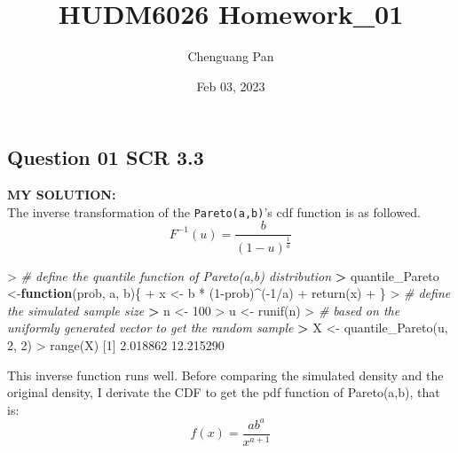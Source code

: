 \documentclass[
]{article}
\title{HUDM6026 Homework\_01}
\author{Chenguang Pan}
\date{Feb 03, 2023}
\newenvironment{Shaded}{\begin{snugshade}}{\end{snugshade}}
\newcommand{\CommentTok}[1]{\textcolor[rgb]{0.56,0.35,0.01}{\textit{#1}}}
\newcommand{\ControlFlowTok}[1]{\textcolor[rgb]{0.13,0.29,0.53}{\textbf{#1}}}
\newcommand{\DecValTok}[1]{\textcolor[rgb]{0.00,0.00,0.81}{#1}}
\newcommand{\ErrorTok}[1]{\textcolor[rgb]{0.64,0.00,0.00}{\textbf{#1}}}
\newcommand{\FloatTok}[1]{\textcolor[rgb]{0.00,0.00,0.81}{#1}}
\newcommand{\FunctionTok}[1]{\textcolor[rgb]{0.00,0.00,0.00}{#1}}
\newcommand{\NormalTok}[1]{#1}
\newcommand{\OtherTok}[1]{\textcolor[rgb]{0.56,0.35,0.01}{#1}}
\newcommand{\SpecialCharTok}[1]{\textcolor[rgb]{0.00,0.00,0.00}{#1}}
\begin{document}
\maketitle

\hypertarget{question-01-scr-3.3}{%
\subsection{Question 01 SCR 3.3}\label{question-01-scr-3.3}}

\textbf{MY SOLUTION:}\\
The inverse transformation of the \texttt{Pareto(a,b)}'s cdf function is
as followed. \[F^{-1}(u)=\frac{b}{(1-u)^\frac{1}{a}} \]

\begin{Shaded}
\begin{Highlighting}[]
\SpecialCharTok{\textgreater{}} \CommentTok{\# define the quantile function of Pareto(a,b) distribution}
\ErrorTok{\textgreater{}}\NormalTok{ quantile\_Pareto }\OtherTok{\textless{}{-}}\ControlFlowTok{function}\NormalTok{(prob, a, b)\{}
\SpecialCharTok{+}\NormalTok{   x }\OtherTok{\textless{}{-}}\NormalTok{ b }\SpecialCharTok{*}\NormalTok{ (}\DecValTok{1}\SpecialCharTok{{-}}\NormalTok{prob)}\SpecialCharTok{\^{}}\NormalTok{(}\SpecialCharTok{{-}}\DecValTok{1}\SpecialCharTok{/}\NormalTok{a)}
\SpecialCharTok{+}   \FunctionTok{return}\NormalTok{(x)}
\SpecialCharTok{+}\NormalTok{ \}}
\SpecialCharTok{\textgreater{}} \CommentTok{\# define the simulated sample size}
\ErrorTok{\textgreater{}}\NormalTok{ n }\OtherTok{\textless{}{-}} \DecValTok{100}
\SpecialCharTok{\textgreater{}}\NormalTok{ u }\OtherTok{\textless{}{-}} \FunctionTok{runif}\NormalTok{(n)}
\SpecialCharTok{\textgreater{}} \CommentTok{\# based on the uniformly generated vector to get the random sample}
\ErrorTok{\textgreater{}}\NormalTok{ X }\OtherTok{\textless{}{-}} \FunctionTok{quantile\_Pareto}\NormalTok{(u, }\DecValTok{2}\NormalTok{, }\DecValTok{2}\NormalTok{)}
\SpecialCharTok{\textgreater{}} \FunctionTok{range}\NormalTok{(X)}
\NormalTok{[}\DecValTok{1}\NormalTok{]  }\FloatTok{2.018862} \FloatTok{12.215290}
\end{Highlighting}
\end{Shaded}

This inverse function runs well. Before comparing the simulated density
and the original density, I derivate the CDF to get the pdf function of
Pareto(a,b), that is:\[f(x)=\frac{ab^a}{x^{a+1}}\]
\end{document}
